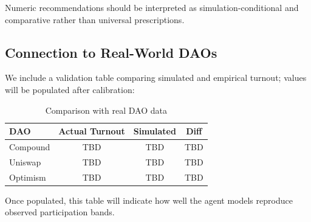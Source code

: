 \noindent
Numeric recommendations should be interpreted as simulation-conditional and comparative rather than universal prescriptions.

\subsection{Connection to Real-World DAOs}

We include a validation table comparing simulated and empirical turnout; values will be populated after calibration:

\begin{table}[htbp]
\centering
\caption{Comparison with real DAO data}
\begin{tabular}{lccc}
\toprule
DAO & Actual Turnout & Simulated & Diff \\
\midrule
Compound & TBD & TBD & TBD \\
Uniswap & TBD & TBD & TBD \\
Optimism & TBD & TBD & TBD \\
\bottomrule
\end{tabular}
\end{table}

Once populated, this table will indicate how well the agent models reproduce observed participation bands.
